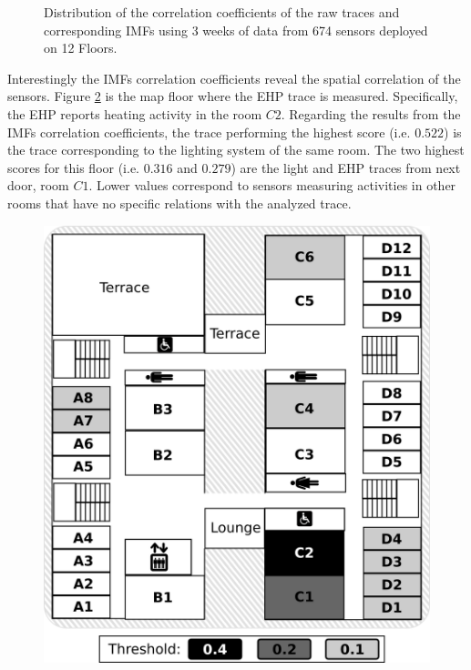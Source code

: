 \begin{figure}[tbh!]
\centering
 \caption{Distribution of the correlation coefficients of the raw traces and corresponding IMFs using 3 weeks of data from 674 sensors deployed on 12 Floors.}
\label{fig:histo}
\end{figure}

Interestingly the IMFs correlation coefficients reveal the spatial correlation of the sensors.
Figure \ref{fig:map} is the map floor where the EHP trace is measured.
Specifically, the EHP reports heating activity in the room $C2$.
Regarding the results from the IMFs correlation coefficients, the trace performing the highest score (i.e. $0.522$) is the trace corresponding to the lighting system of the same room.
The two highest scores for this floor (i.e. $0.316$ and $0.279$) are the light and EHP traces from next door, room $C1$.
Lower values correspond to sensors measuring activities in other rooms that have no specific relations with the analyzed trace.

\begin{figure}
\includegraphics[width=.5\textwidth]{img/floorMap.png}
\caption{}
\label{fig:map}
\end{figure}
